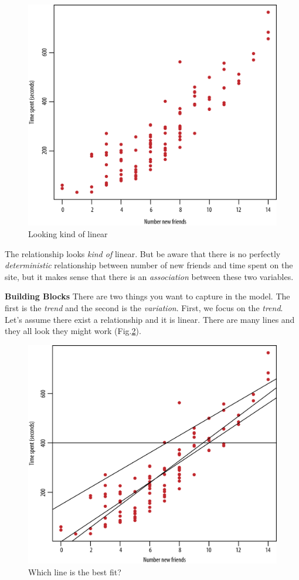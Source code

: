 \begin{figure}[H]
    \centering
    \includegraphics[width=0.7\linewidth]{imgs/fundamental_algo/algo_2.png}
    \caption{Looking kind of linear}
    \label{fig:algo_2}
\end{figure}

The relationship looks \textit{kind of} linear. But be aware that there is no perfectly \textit{deterministic} relationship between number of new friends and time spent on the site, but it makes sense that there is an \textit{association} between these two variables.

\textbf{Building Blocks} There are two things you want to capture in the model. The first is the \textit{trend} and the second is the \textit{variation}. First, we focus on the \textit{trend}. Let's assume there exist a relationship and it is linear. There are many lines and they all look they might work (Fig.\ref{fig:algo_3}).

\begin{figure}[H]
    \centering
    \includegraphics[width=0.7\linewidth]{imgs/fundamental_algo/algo_3.png}
    \caption{Which line is the best fit?}
    \label{fig:algo_3}
\end{figure}

